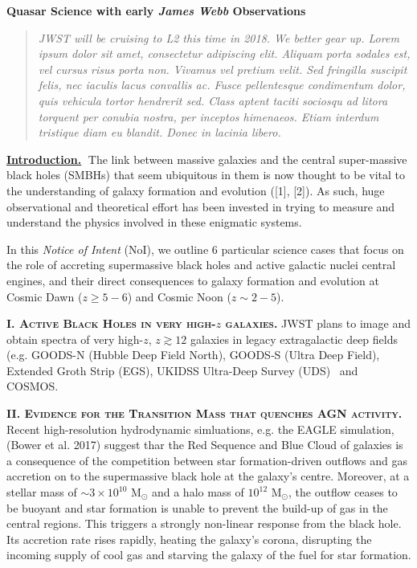 \documentclass[11pt,epsf]{article}
\begin{document}
\vspace{-44pt} 
\begin{center}
  {\Large \bf Quasar Science with early {\it James Webb} Observations}
\end{center}

\begin{quotation}
\noindent
{\it  JWST will be cruising to L2 this time in 2018. We better gear up. 
Lorem ipsum dolor sit amet, consectetur adipiscing elit. Aliquam porta
sodales est, vel cursus risus porta non. Vivamus vel pretium
velit. Sed fringilla suscipit felis, nec iaculis lacus convallis
ac. Fusce pellentesque condimentum dolor, quis vehicula tortor
hendrerit sed. Class aptent taciti sociosqu ad litora torquent per
conubia nostra, per inceptos himenaeos. Etiam interdum tristique diam
eu blandit. Donec in lacinia libero.}
\noindent
\end{quotation}


\smallskip
\smallskip
\noindent
{\bf \underline{Introduction.}$\;$}
The link between massive galaxies and the central super-massive black
holes (SMBHs) that seem ubiquitous in them is now thought to be vital
to the understanding of galaxy formation and evolution ([1], [2]).  As
such, huge observational and theoretical effort has been invested in
trying to measure and understand the physics involved in these
enigmatic systems. 

\noindent
In this {\it Notice of Intent} (NoI), we outline 6 particular science cases 
that focus on the role of accreting supermassive black holes and 
active galactic nuclei central engines, and their direct consequences 
to galaxy formation and evolution at Cosmic Dawn ($z\geq5-6$) and 
Cosmic Noon ($z\sim2-5$). 



\medskip
\medskip

\smallskip
\smallskip
\noindent
\textbf{\textsc{I. Active Black Holes in very high-$z$ galaxies.}} 
JWST plans to image and obtain spectra of very high-$z$, $z\gtrsim12$
galaxies in legacy extragalactic deep fields (e.g. GOODS-N (Hubble
Deep Field North), GOODS‐S (Ultra Deep Field), Extended Groth Strip
(EGS), UKIDSS Ultra-Deep Survey (UDS) \ and COSMOS.


\medskip
\medskip


\smallskip
\smallskip
\noindent
\textbf{\textsc{II. Evidence for the Transition Mass that quenches AGN activity.}} 
Recent high-resolution hydrodynamic simluations, e.g. the EAGLE
simulation, (Bower et al. 2017) suggest thar the Red Sequence and Blue
Cloud of galaxies is a consequence of the competition between star
formation-driven outflows and gas accretion on to the supermassive
black hole at the galaxy’s centre.  Moreover, at a stellar mass of
$\sim3{\times}10^{10}$ M$_{\odot}$ and a halo mass of $10^{12}$
M$_{\odot}$, the outflow ceases to be buoyant and star formation is
unable to prevent the build-up of gas in the central regions. This
triggers a strongly non-linear response from the black hole. Its
accretion rate rises rapidly, heating the galaxy’s corona, disrupting
the incoming supply of cool gas and starving the galaxy of the fuel
for star formation.
\end{document}

